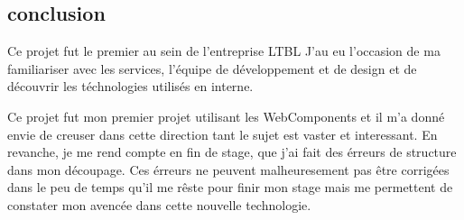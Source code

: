 \subsection{conclusion}
\label{bmxconclusion}

Ce projet fut le premier au sein de l'entreprise LTBL
J'au eu l'occasion de ma familiariser avec les services, l'équipe de développement et de design et de découvrir les téchnologies utilisés en interne.

Ce projet fut mon premier projet utilisant les WebComponents et il m'a donné envie de creuser dans cette direction tant le sujet est vaster et interessant.
En revanche, je me rend compte en fin de stage, que j'ai fait des érreurs de structure dans mon découpage.
Ces érreurs ne peuvent malheuresement pas être corrigées dans le peu de temps qu'il me rêste pour finir mon stage mais me permettent de constater mon avencée dans cette nouvelle technologie.